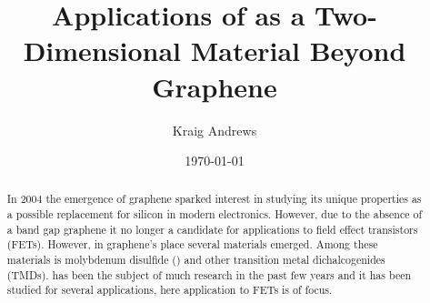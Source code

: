 \documentclass[%
 reprint,
 amsmath,amssymb,
 aps,
pra,
floatfix,
]{revtex4-1}
\begin{document}

\title{Applications of  as a Two-Dimensional Material Beyond Graphene}%

\author{Kraig Andrews}%
%




\date{\today}%

\begin{abstract}
In 2004 the emergence of graphene sparked interest in studying its unique properties as a possible replacement for silicon in modern electronics. However, due to the absence of a band gap graphene it no longer a candidate for applications to field effect transistors (FETs). However, in graphene's place several materials emerged. Among these materials is molybdenum disulfide () and other transition metal dichalcogenides (TMDs).  has been the subject of much research in the past few years and it has been studied for several applications, here application to FETs is of focus.
\end{abstract}

\maketitle

\end{document}
